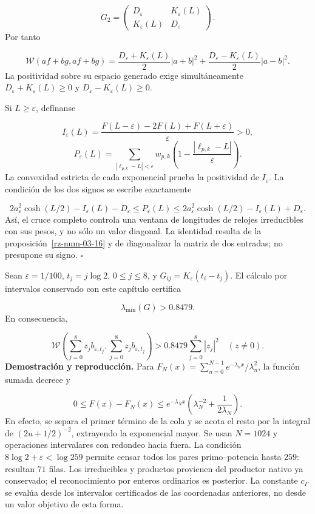 \[
G_2=\begin{pmatrix}D_\varepsilon&K_\varepsilon(L)\\
K_\varepsilon(L)&D_\varepsilon\end{pmatrix}.
\]
Por tanto

\[
\mathscr W(af+bg,af+bg)=
\frac{D_\varepsilon+K_\varepsilon(L)}2|a+b|^2
+\frac{D_\varepsilon-K_\varepsilon(L)}2|a-b|^2.
\]
La positividad sobre su espacio generado exige simultáneamente \(D_\varepsilon+K_\varepsilon(L)\geq0\) y \(D_\varepsilon-K_\varepsilon(L)\geq0\).

Si \(L\geq\varepsilon\), defínanse

\[
I_\varepsilon(L)=
\frac{F(L-\varepsilon)-2F(L)+F(L+\varepsilon)}{\varepsilon}>0,
\]
\[
P_\varepsilon(L)=
\sum_{|\ell_{p,k}-L|<\varepsilon}w_{p,k}
\left(1-\frac{|\ell_{p,k}-L|}{\varepsilon}\right).
\]
La convexidad estricta de cada exponencial prueba la positividad de \(I_\varepsilon\). La condición de los dos signos se escribe exactamente

\[
2a_\varepsilon^2\cosh(L/2)-I_\varepsilon(L)-D_\varepsilon
\leq P_\varepsilon(L)
\leq
2a_\varepsilon^2\cosh(L/2)-I_\varepsilon(L)+D_\varepsilon.
\]
Así, el cruce completo controla una ventana de longitudes de relojes irreducibles con sus pesos, y no sólo un valor diagonal. La identidad resulta de la proposición~\ref{rz-num-03-16} y de diagonalizar la matriz de dos entradas; no presupone su signo. \hfill\(\square\)

Sean \(\varepsilon=1/100\), \(t_j=j\log2\), \(0\leq j\leq8\), y \(G_{ij}=K_\varepsilon(t_i-t_j)\). El cálculo por intervalos conservado con este capítulo certifica

\[
\lambda_{\min}(G)>0.8479.
\]
En consecuencia,

\[
\mathscr W\left(\sum_{j=0}^8z_jb_{\varepsilon,t_j},
\sum_{j=0}^8z_jb_{\varepsilon,t_j}\right)
>0.8479\sum_{j=0}^8|z_j|^2
\quad(z\neq0).
\]
\textbf{Demostración y reproducción.} Para \(F_N(x)=\sum_{n=0}^{N-1}e^{-\lambda_nx}/\lambda_n^2\), la función sumada decrece y

\[
0\leq F(x)-F_N(x)
\leq e^{-\lambda_Nx}
\left(\lambda_N^{-2}+\frac1{2\lambda_N}\right).
\]
En efecto, se separa el primer término de la cola y se acota el resto por la integral de \((2u+1/2)^{-2}\), extrayendo la exponencial mayor. Se usan \(N=1024\) y operaciones intervalares con redondeo hacia fuera. La condición \(8\log2+\varepsilon<\log259\) permite censar todos los pares primo–potencia hasta \(259\): resultan \(71\) filas. Los irreducibles y productos provienen del productor nativo ya conservado; el reconocimiento por enteros ordinarios es posterior. La constante \(c_\Gamma\) se evalúa desde los intervalos certificados de las coordenadas anteriores, no desde un valor objetivo de esta forma.

